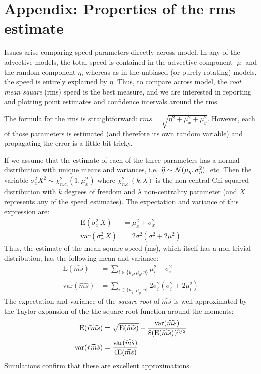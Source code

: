 \documentclass[10pt]{article}\usepackage[]{graphicx}\usepackage[]{color}
\begin{document}
\section*{Appendix: Properties of the rms estimate}

Issues arise comparing speed parameters directly across model. In any of the advective models, the total speed is contained in the advective component $|\mu|$ and the random component $\eta$, whereas as in the unbiased (or purely rotating) models, the speed is entirely explained by $\eta$.  Thus, to compare across model, the \emph{root mean square} (rms) speed is the best measure, and we are interested in reporting and plotting point estimates and confidence intervals around the rms.  

The formula for the rms is straightforward:  $rms = \sqrt{\eta^2 + \mu_x^2 + \mu_y^2}$.  However, each of those parameters is estimated (and therefore its own random variable) and propagating the error is a little bit tricky. 

If we assume that the estimate of each of the three parameters has a normal distribution with unique means and variances, i.e.~$\widehat{\eta} \sim {\cal N}(\mu_\eta, \sigma_\eta^2)$, etc. Then the variable $\sigma_x^2 X^2 \sim \chi^2_{n.c.}(1, \mu_x^2)$ where $\chi^2_{n.c.}(k, \lambda)$ is the non-central Chi-squared distribution with $k$ degrees of freedom and $\lambda$ non-centrality parameter (and $X$ represents any of the speed estimates). The expectation and variance of this expression are:
\begin{align}
\text{E}(\sigma_x^2 \, X) &= \mu_x^2 + \sigma_x^2\\
\text{var}(\sigma_x^2 \, X) &=  2 \sigma^2  (\sigma^2 + 2 \mu^2)
\end{align}
\noindent Thus, the estimate of the mean square speed (ms), which itself has a non-trivial distribution, has the following mean and variance:
\begin{align}
\text{E}(\widehat{ms}) &= \sum_{i \in \{\mu_x, \mu_y, \eta\}} \mu_i^2 + \sigma_i^2\\
\text{var}(\widehat{ms}) &= \sum_{i \in \{\mu_x, \mu_y, \eta\}} 2 \sigma_i^2  (\sigma_i^2 + 2 \mu_i^2)
\end{align}
\noindent The expectation and variance of the \emph{square root} of $\widehat{ms}$ is well-approximated by the Taylor expansion of the the square root function around the moments:
\begin{align}
\text{E}(\widehat{rms}) &= \sqrt{\text{E}(\widehat{ms})} - {\text{var}(\widehat{ms}) \over 8 (\text{E}(\widehat{ms}))^{3/2}} \\
\text{var}(\widehat{rms}) &= {\text{var}(\widehat{ms}) \over 4 \text{E}(\widehat{ms})}
\end{align}
\noindent Simulations confirm that these are excellent approximations.  
\end{document}
